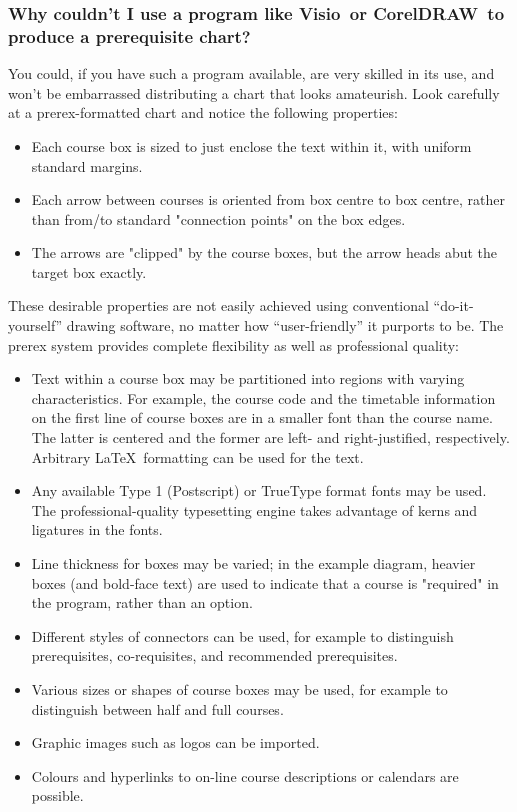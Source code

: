 \documentclass[11pt]{article}
\def\LaTeX{\mbox{LaTeX}}
\begin{document}
\subsubsection*{Why couldn't I use a program like Visio\textsuperscript{\textregistered}\ or CorelDRAW\textsuperscript{\textregistered}\ to produce a prerequisite chart?}
You could, if you have such a program available, are very skilled in its
use, and won't be embarrassed
distributing a chart that looks amateurish. Look carefully at a prerex-formatted 
chart and notice the following properties:
\begin{itemize}
\item Each course box is sized to just enclose the text within it, with
    uniform standard margins.
\item Each arrow between courses is oriented from box centre to box centre,
    rather than from/to standard "connection points" on the box edges.
\item The arrows are "clipped" by the course boxes, but the arrow heads abut
    the target box exactly.
\end{itemize}
These desirable properties are not easily achieved using conventional
``do-it-yourself'' drawing software, no matter how ``user-friendly'' it
purports to be.
The prerex system provides complete flexibility as well as professional
quality:
\begin{itemize}
\item Text within a course box may be partitioned into regions with varying
    characteristics. For example, the course code and the timetable
    information on the first line of course boxes are in a smaller font
    than the course name. The latter is centered and the former are left-
    and right-justified, respectively. Arbitrary \LaTeX\ formatting can be used
    for the text.
\item Any available Type 1 (Postscript) or TrueType format fonts may be used.
    The professional-quality
    typesetting engine takes advantage of kerns and ligatures in the fonts.
\item Line thickness for boxes may be varied; in the example diagram, heavier
    boxes (and bold-face text) are used to indicate that a course is
    "required" in the program, rather than an option.
\item Different styles of connectors can be used, for example to distinguish
    prerequisites, co-requisites, and recommended prerequisites.
\item Various sizes or shapes of course boxes may be used, for example to
    distinguish between half and full courses.
\item Graphic images such as logos can be imported.
\item Colours and hyperlinks to on-line course descriptions or calendars are
    possible.
\end{itemize}
\end{document}
